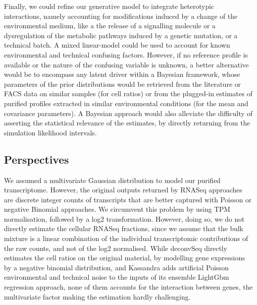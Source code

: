 \documentclass[long, final]{jobim}
\begin{document}
Finally, we could refine our generative model to integrate heterotypic interactions, namely accounting for modifications induced by a change of the environmental medium, like a the release of a signalling molecule or a dysregulation of the metabolic pathways induced by a genetic mutation, or a technical batch. A mixed linear-model could be used to account for known environmental and technical confusing factors. However, if no reference profile is available or the nature of the confusing variable is unknown, a better alternative would be to encompass any latent driver within a Bayesian framework, whose parameters of the prior distributions would be retrieved from the literature or FACS data on similar samples (for cell ratios) or from the plugged-in estimates of purified profiles extracted in similar environmental conditions (for the mean and covariance parameters). A Bayesian approach would also alleviate the difficulty of asserting the statistical relevance of the estimates, by directly returning from the simulation likelihood intervals. 




\subsection{Perspectives}
\label{subsec:perspectives}

We assumed a multivariate Gaussian distribution to model our purified transcriptome. However, the original outputs returned by RNASeq approaches are discrete integer counts of transcripts that are better captured with Poisson or negative Binomial approaches. We circumvent this problem by using TPM normalisation, followed by a log2 transformation. However, doing so, we do not directly estimate the cellular RNASeq fractions, since we assume that the bulk mixture is a linear combination of the individual transcriptomic contributions of the raw counts, and not of the log2 normalised. While deconvSeq \cite{du_etal19} directly estimates the cell ratios on the original material, by modelling gene expressions by a negative binomial distribution, and Kassandra \cite{zaitsev_etal22} adds artificial Poisson environmental and technical noise to the inputs of its ensemble LightGbm regression approach, none of them accounts for the interaction between genes, the multivariate factor making the estimation hardly challenging. 
\end{document}
